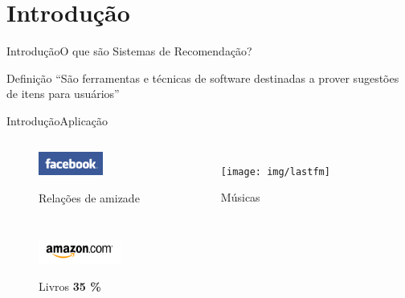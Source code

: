 \section[Introdução]{Introdução}
\begin{frame}{Introdução}{O que são Sistemas de Recomendação?}
\begin{block}{Definição}
``São ferramentas e técnicas de software destinadas a prover sugestões de itens para usuários'' \cite{ricci2011introduction-chap1}
\end{block}
\end{frame}

\begin{frame}{Introdução}{Aplicação}
\begin{columns}[c]


\begin{figure}[ht]
    \begin{center}
    \includegraphics[height=30px]{img/facebook}

    Relações de amizade
    \end{center}
\end{figure}


\begin{figure}[ht]
    \begin{center}
    \texttt{[image: img/lastfm]}

    Músicas
    \end{center}
\end{figure}
\end{columns}
\begin{columns}[b]


\begin{figure}[ht]
    \begin{center}
    \includegraphics[height=30px]{img/amazon}

    Livros \textbf{35 \%} \\
    \cite{amazon35}
    \end{center}
\end{figure}


\end{columns}
\end{frame}
